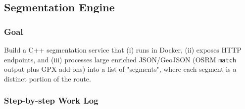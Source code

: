 \documentclass[11pt,twoside]{report}
\begin{document}
\subsection{Segmentation Engine}

\subsubsection{Goal}
Build a C++ segmentation service that (i) runs in Docker, (ii) exposes HTTP endpoints, and (iii) processes large enriched JSON/GeoJSON (OSRM \texttt{match} output plus GPX add-ons) into a list of "segments", where each segment is
a distinct portion of the route.

\subsubsection{Step-by-step Work Log}
\end{document}
